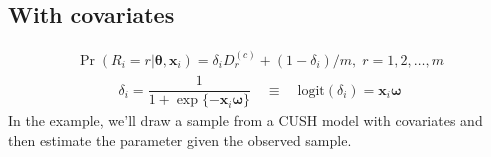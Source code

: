 \documentclass[letterpaper,10pt,english]{sphinxmanual}
\begin{document}
\subsection{With covariates}
\label{\detokenize{manual:cush-with-covariates}}\label{\detokenize{manual:id21}}
\sphinxAtStartPar
{}
\begin{equation*}
\begin{split}\Pr(R_i=r|\pmb\theta,\pmb x_i) = \delta_i D_r^{(c)} + (1-\delta_i)/m
,\; r=1,2,\ldots,m\end{split}
\end{equation*}\begin{equation*}
\begin{split}\delta_i = \dfrac{1}{1+\exp\{ - \pmb x_i \pmb\omega \}}
\quad \equiv \quad
\mathrm{logit}(\delta_i) = \pmb x_i \pmb\omega\end{split}
\end{equation*}
\sphinxAtStartPar
In the example, we’ll draw a sample from a CUSH model with covariates and
then estimate the parameter given the observed sample.
\end{document}
